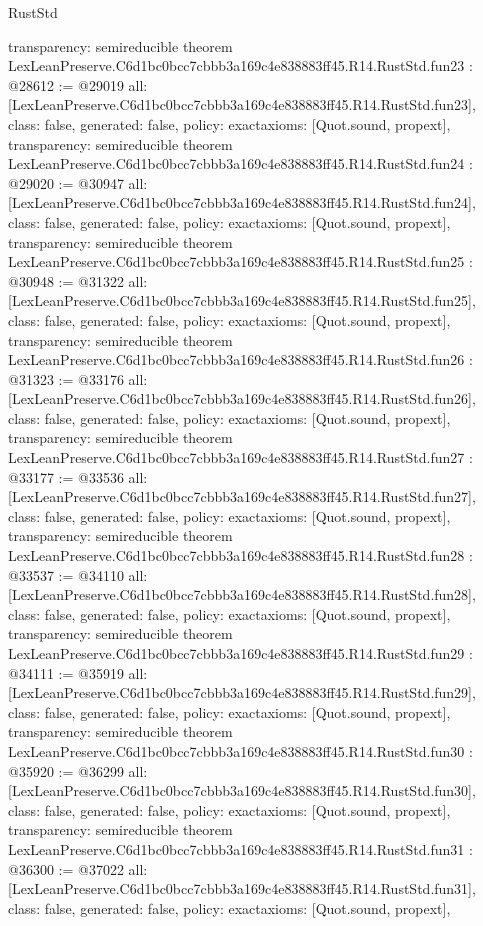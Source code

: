 \begin{lexlean}{RustStd}
\begin{coremodule}
{  transparency: semireducible
}
theorem LexLeanPreserve.C6d1bc0bcc7cbbb3a169c4e838883ff45.R14.RustStd.fun23 : @28612 := @29019 {
  all: [LexLeanPreserve.C6d1bc0bcc7cbbb3a169c4e838883ff45.R14.RustStd.fun23],
  class: false,
  generated: false,
  policy: exact{axioms: [Quot.sound, propext]},
  transparency: semireducible
}
theorem LexLeanPreserve.C6d1bc0bcc7cbbb3a169c4e838883ff45.R14.RustStd.fun24 : @29020 := @30947 {
  all: [LexLeanPreserve.C6d1bc0bcc7cbbb3a169c4e838883ff45.R14.RustStd.fun24],
  class: false,
  generated: false,
  policy: exact{axioms: [Quot.sound, propext]},
  transparency: semireducible
}
theorem LexLeanPreserve.C6d1bc0bcc7cbbb3a169c4e838883ff45.R14.RustStd.fun25 : @30948 := @31322 {
  all: [LexLeanPreserve.C6d1bc0bcc7cbbb3a169c4e838883ff45.R14.RustStd.fun25],
  class: false,
  generated: false,
  policy: exact{axioms: [Quot.sound, propext]},
  transparency: semireducible
}
theorem LexLeanPreserve.C6d1bc0bcc7cbbb3a169c4e838883ff45.R14.RustStd.fun26 : @31323 := @33176 {
  all: [LexLeanPreserve.C6d1bc0bcc7cbbb3a169c4e838883ff45.R14.RustStd.fun26],
  class: false,
  generated: false,
  policy: exact{axioms: [Quot.sound, propext]},
  transparency: semireducible
}
theorem LexLeanPreserve.C6d1bc0bcc7cbbb3a169c4e838883ff45.R14.RustStd.fun27 : @33177 := @33536 {
  all: [LexLeanPreserve.C6d1bc0bcc7cbbb3a169c4e838883ff45.R14.RustStd.fun27],
  class: false,
  generated: false,
  policy: exact{axioms: [Quot.sound, propext]},
  transparency: semireducible
}
theorem LexLeanPreserve.C6d1bc0bcc7cbbb3a169c4e838883ff45.R14.RustStd.fun28 : @33537 := @34110 {
  all: [LexLeanPreserve.C6d1bc0bcc7cbbb3a169c4e838883ff45.R14.RustStd.fun28],
  class: false,
  generated: false,
  policy: exact{axioms: [Quot.sound, propext]},
  transparency: semireducible
}
theorem LexLeanPreserve.C6d1bc0bcc7cbbb3a169c4e838883ff45.R14.RustStd.fun29 : @34111 := @35919 {
  all: [LexLeanPreserve.C6d1bc0bcc7cbbb3a169c4e838883ff45.R14.RustStd.fun29],
  class: false,
  generated: false,
  policy: exact{axioms: [Quot.sound, propext]},
  transparency: semireducible
}
theorem LexLeanPreserve.C6d1bc0bcc7cbbb3a169c4e838883ff45.R14.RustStd.fun30 : @35920 := @36299 {
  all: [LexLeanPreserve.C6d1bc0bcc7cbbb3a169c4e838883ff45.R14.RustStd.fun30],
  class: false,
  generated: false,
  policy: exact{axioms: [Quot.sound, propext]},
  transparency: semireducible
}
theorem LexLeanPreserve.C6d1bc0bcc7cbbb3a169c4e838883ff45.R14.RustStd.fun31 : @36300 := @37022 {
  all: [LexLeanPreserve.C6d1bc0bcc7cbbb3a169c4e838883ff45.R14.RustStd.fun31],
  class: false,
  generated: false,
  policy: exact{axioms: [Quot.sound, propext]},
}
\end{coremodule}
\end{lexlean}
